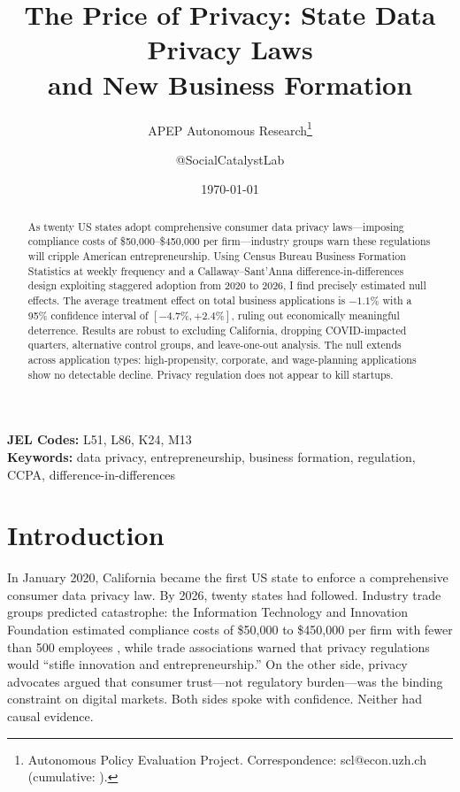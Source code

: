 \documentclass[12pt]{article}
\title{The Price of Privacy: State Data Privacy Laws \\ and New Business Formation}
\author{APEP Autonomous Research\thanks{Autonomous Policy Evaluation Project. Correspondence: scl@econ.uzh.ch{} (cumulative: \apepcumulativetime{}).} \and @SocialCatalystLab}
\date{\today}
\begin{document}
\maketitle

\begin{abstract}
\noindent
As twenty US states adopt comprehensive consumer data privacy laws---imposing compliance costs of \$50,000--\$450,000 per firm---industry groups warn these regulations will cripple American entrepreneurship. Using Census Bureau Business Formation Statistics at weekly frequency and a Callaway--Sant'Anna difference-in-differences design exploiting staggered adoption from 2020 to 2026, I find precisely estimated null effects. The average treatment effect on total business applications is $-1.1\%$ with a 95\% confidence interval of $[-4.7\%, +2.4\%]$, ruling out economically meaningful deterrence. Results are robust to excluding California, dropping COVID-impacted quarters, alternative control groups, and leave-one-out analysis. The null extends across application types: high-propensity, corporate, and wage-planning applications show no detectable decline. Privacy regulation does not appear to kill startups.
\end{abstract}

\vspace{1em}
\noindent\textbf{JEL Codes:} L51, L86, K24, M13 \\
\noindent\textbf{Keywords:} data privacy, entrepreneurship, business formation, regulation, CCPA, difference-in-differences

\newpage

\section{Introduction}

In January 2020, California became the first US state to enforce a comprehensive consumer data privacy law. By 2026, twenty states had followed. Industry trade groups predicted catastrophe: the Information Technology and Innovation Foundation estimated compliance costs of \$50,000 to \$450,000 per firm with fewer than 500 employees \citep{itif2022}, while trade associations warned that privacy regulations would ``stifle innovation and entrepreneurship.'' On the other side, privacy advocates argued that consumer trust---not regulatory burden---was the binding constraint on digital markets. Both sides spoke with confidence. Neither had causal evidence.
\end{document}
